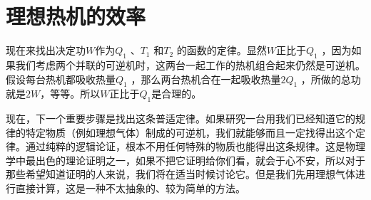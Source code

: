 \section{理想热机的效率}

现在来找出决定功$W$作为$Q_1$ 、$T_1$ 和$T_2$ 的函数的定律。显然$W$正比于$Q_1$ ，因为如果我们考虑两个并联的可逆机时，这两台一起工作的热机组合起来仍然是可逆机。假设每台热机都吸收热量$Q_1$ ，那么两台热机合在一起吸收热量$2Q_1$ ，所做的总功就是$2W$，等等。所以$W$正比于$Q_1$是合理的。

现在，下一个重要步骤是找出这条普适定律。如果研究一台用我们已经知道它的规律的特定物质（例如理想气体）制成的可逆机，我们就能够而且一定找得出这个定律。通过纯粹的逻辑论证，根本不用任何特殊的物质也能得出这条规律。这是物理学中最出色的理论证明之一，如果不把它证明给你们看，就会于心不安，所以对于那些希望知道证明的人来说，我们将在适当时候讨论它。但是我们先用理想气体进行直接计算，这是一种不太抽象的、较为简单的方法。

